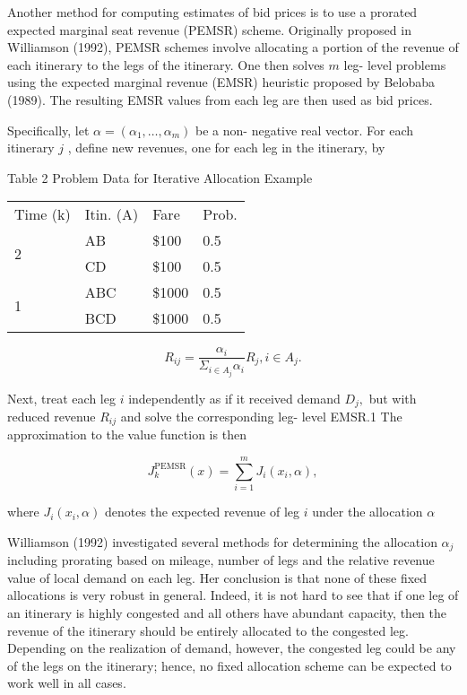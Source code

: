 Another method for computing estimates of bid prices is to use a
prorated expected marginal seat revenue (PEMSR) scheme. Originally
proposed in Williamson (1992), PEMSR schemes involve allocating a
portion of the revenue of each itinerary to the legs of the itinerary.
One then solves \(m\) leg- level problems using the expected marginal
revenue (EMSR) heuristic proposed by Belobaba (1989). The resulting EMSR
values from each leg are then used as bid prices.

Specifically, let \(\alpha = (\alpha_{1}, \ldots , \alpha_{m})\) be a
non- negative real vector. For each itinerary \(j\) , define new
revenues, one for each leg in the itinerary, by

Table 2 Problem Data for Iterative Allocation Example

\begin{longtable}[]{@{}llll@{}}
\toprule\noalign{}
\endhead
\bottomrule\noalign{}
\endlastfoot
Time (k) & Itin. (A) & Fare & Prob. \\
\multirow{2}{*}{2} & AB & \$100 & 0.5 \\
& CD & \$100 & 0.5 \\
\multirow{2}{*}{1} & ABC & \$1000 & 0.5 \\
& BCD & \$1000 & 0.5 \\
\end{longtable}

\[
R_{ij} = \frac{\alpha_i}{\Sigma_{i\in A_j}\alpha_i} R_{j}, i\in A_j.
\]

Next, treat each leg \(i\) independently as if it received demand
\(D_{j},\) but with reduced revenue \(R_{ij}\) and solve the
corresponding leg- level EMSR.1 The approximation to the value function
is then

\[
J_{k}^{\mathrm{PEMSR}}(x) = \sum_{i = 1}^{m}J_{i}(x_{i},\alpha),
\]

where \(J_{i}(x_{i},\alpha)\) denotes the expected revenue of leg \(i\)
under the allocation \(\alpha\)

Williamson (1992) investigated several methods for determining the
allocation \(\alpha_{j}\) including prorating based on mileage, number
of legs and the relative revenue value of local demand on each leg. Her
conclusion is that none of these fixed allocations is very robust in
general. Indeed, it is not hard to see that if one leg of an itinerary
is highly congested and all others have abundant capacity, then the
revenue of the itinerary should be entirely allocated to the congested
leg. Depending on the realization of demand, however, the congested leg
could be any of the legs on the itinerary; hence, no fixed allocation
scheme can be expected to work well in all cases.

